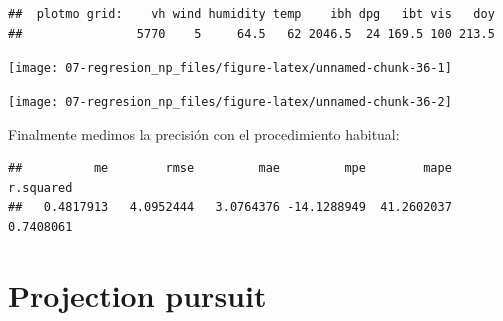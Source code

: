 \documentclass[
  spanish,
]{book}
\newenvironment{Shaded}{\begin{snugshade}}{\end{snugshade}}
\newcommand{\AttributeTok}[1]{\textcolor[rgb]{0.77,0.63,0.00}{#1}}
\newcommand{\DecValTok}[1]{\textcolor[rgb]{0.00,0.00,0.81}{#1}}
\newcommand{\FunctionTok}[1]{\textcolor[rgb]{0.00,0.00,0.00}{#1}}
\newcommand{\NormalTok}[1]{#1}
\newcommand{\OtherTok}[1]{\textcolor[rgb]{0.56,0.35,0.01}{#1}}
\newcommand{\SpecialCharTok}[1]{\textcolor[rgb]{0.00,0.00,0.00}{#1}}
\newcommand{\StringTok}[1]{\textcolor[rgb]{0.31,0.60,0.02}{#1}}
\theoremstyle{break}
\theoremstyle{definition}
\theoremstyle{definition}
\theoremstyle{definition}
\theoremstyle{definition}
\theoremstyle{remark}
\begin{document}
\begin{verbatim}
##  plotmo grid:    vh wind humidity temp    ibh dpg   ibt vis   doy
##                5770    5     64.5   62 2046.5  24 169.5 100 213.5
\end{verbatim}

\begin{center}\texttt{[image: 07-regresion\_np\_files/figure-latex/unnamed-chunk-36-1]} \end{center}

\begin{Shaded}
\end{Shaded}

\begin{center}\texttt{[image: 07-regresion\_np\_files/figure-latex/unnamed-chunk-36-2]} \end{center}

Finalmente medimos la precisión con el procedimiento habitual:

\begin{Shaded}
\end{Shaded}

\begin{verbatim}
##          me        rmse         mae         mpe        mape   r.squared 
##   0.4817913   4.0952444   3.0764376 -14.1288949  41.2602037   0.7408061
\end{verbatim}

\hypertarget{projection-pursuit}{%
\section{Projection pursuit}\label{projection-pursuit}}
\end{document}
